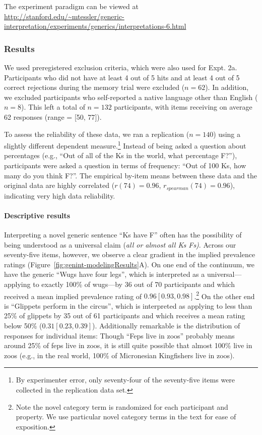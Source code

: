 \documentclass[floatsintext,doc]{apa6}
\theoremstyle{definition}
\theoremstyle{definition}
\theoremstyle{definition}
\theoremstyle{remark}
\begin{document}
The experiment paradigm can be viewed at
\url{http://stanford.edu/~mtessler/generic-interpretation/experiments/generics/interpretations-6.html}

\subsubsection{Results}\label{results-2}

We used preregistered exclusion criteria, which were also used for Expt.
2a. Participants who did not have at least 4 out of 5 hits and at least
4 out of 5 correct rejections during the memory trial were excluded
(\(n = 62\)). In addition, we excluded participants who self-reported a
native language other than English (\(n = 8\)). This left a total of
\(n = 132\) participants, with items receiving on average 62 responses
(range = {[}50, 77{]}).

To assess the reliability of these data, we ran a replication
(\(n=140\)) using a slightly different dependent measure.\footnote{By
  experimenter error, only seventy-four of the seventy-five items were
  collected in the replication data set.} Instead of being asked a
question about percentages (e.g., \enquote{Out of all of the Ks in the
world, what percentage F?}), participants were asked a question in terms
of frequency: \enquote{Out of 100 Ks, how many do you think F?}. The
empirical by-item means between these data and the original data are
highly correlated (\(r(74) = 0.96\), \(r_{spearman}(74)= 0.96\)),
indicating very high data reliability.

\paragraph{Descriptive results}\label{descriptive-results}

Interpreting a novel generic sentence \enquote{Ks have F} often has the
possibility of being understood as a universal claim (\emph{all or
almost all Ks Fs)}. Across our seventy-five items, however, we observe a
clear gradient in the implied prevalence ratings
(Figure~\ref{fig:genint-modelingResults}A). On one end of the continuum,
we have the generic \enquote{Wugs have four legs}, which is interpreted
as a universal---applying to exactly 100\% of wugs---by 36 out of 70
participants and which received a mean implied prevalence rating of
\(0.96 [0.93, 0.98]\).\footnote{Note the novel category term is
  randomized for each participant and property. We use particular novel
  category terms in the text for ease of exposition.} On the other end
is \enquote{Glippets perform in the circus}, which is interpreted as
applying to less than 25\% of glippets by 35 out of 61 participants and
which receives a mean rating below 50\% (\(0.31 [0.23, 0.39]\)).
Additionally remarkable is the distribution of responses for individual
items: Though \enquote{Feps live in zoos} probably means around 25\% of
feps live in zoos, it is still quite possible that almost 100\% live in
zoos (e.g., in the real world, 100\% of Micronesian Kingfishers live in
zoos).
\end{document}
